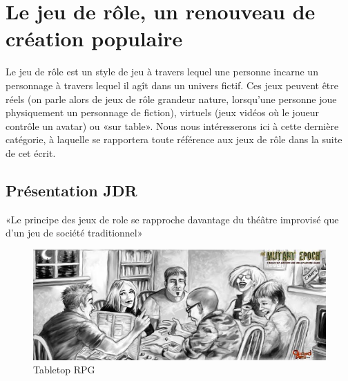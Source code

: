 \section{Le jeu de rôle, un renouveau de création populaire}

Le jeu de rôle est un style de jeu à travers lequel une personne incarne un personnage à travers lequel il agît dans un univers fictif. Ces jeux peuvent être réels (on parle alors de jeux de rôle grandeur nature, lorsqu'une personne joue physiquement un personnage de fiction), virtuels (jeux vidéos où le joueur contrôle un avatar) ou «sur table». Nous nous intéresserons ici à cette dernière catégorie, à laquelle se rapportera toute référence aux jeux de rôle dans la suite de cet écrit.

\subsection{Présentation JDR}

«Le principe des jeux de role se rapproche davantage du théâtre improvisé que d'un jeu de société traditionnel» \cite{cristofari2010lecteur}\\
\begin{figure}[h!]
    \centering
    \includegraphics[width=0.80\linewidth]{img/rpg_tabletop1.jpg}
    \caption{Tabletop RPG}
\end{figure}


